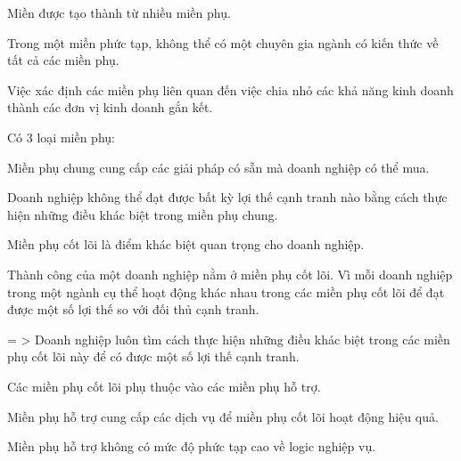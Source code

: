 
Miền được tạo thành từ nhiều miền phụ.


Trong một miền phức tạp, không thể có một chuyên gia ngành có kiến thức về tất cả các miền phụ.

Việc xác định các miền phụ liên quan đến việc chia nhỏ các khả năng kinh doanh thành các đơn vị kinh doanh gắn kết.


Có 3 loại miền phụ:


Miền phụ chung cung cấp các giải pháp có sẵn mà doanh nghiệp có thể mua.

Doanh nghiệp không thể đạt được bất kỳ lợi thế cạnh tranh nào bằng cách thực hiện những điều khác biệt trong miền phụ chung.




Miền phụ cốt lõi là điểm khác biệt quan trọng cho doanh nghiệp.

Thành công của một doanh nghiệp nằm ở miền phụ cốt lõi. Vì mỗi doanh nghiệp trong một ngành cụ thể hoạt động khác nhau trong các miền phụ cốt lõi để đạt được một số lợi thế so với đối thủ cạnh tranh.

= > Doanh nghiệp luôn tìm cách thực hiện những điều khác biệt trong các miền phụ cốt lõi này để có được một số lợi thế cạnh tranh.



Các miền phụ cốt lõi phụ thuộc vào các miền phụ hỗ trợ.

Miền phụ hỗ trợ cung cấp các dịch vụ để miền phụ cốt lõi hoạt động hiệu quả.

Miền phụ hỗ trợ không có mức độ phức tạp cao về logic nghiệp vụ.


